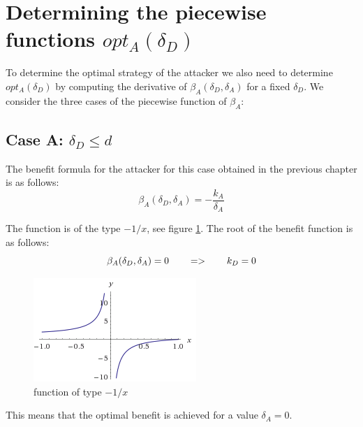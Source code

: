 \section{Determining the piecewise functions $opt_{A}(\delta_{D})$}
To determine the optimal strategy of the attacker we also need to determine $opt_{A}(\delta_{D})$ by computing the derivative of $\beta_{A}(\delta_{D},\delta_{A})$ for a fixed $\delta_{D}$. We consider the three cases of the piecewise function of $\beta_{A}$: \\


\subsection*{Case A: $\delta_{D} \leq d$}

The benefit formula for the attacker for this case obtained in the previous chapter is as follows:
\begin{equation}
\beta_{A}(\delta_{D},\delta_{A}) =  - \dfrac{k_{A}}{\delta_{A}}
\end{equation}


The function is of the type $-1/x$, see figure \ref{1xx}. The root of the benefit function is as follows:
\begin{equation}
\beta_{A}(\delta_{D},\delta_{A}) =0  ~~~~~~ =>~~~~~~k_{D} = 0 \\
\end{equation}


\begin{figure}[hbtp]
\centering
\includegraphics[scale=1]{Images/1x.png}
\caption{function of type $-1/x$}
\label{1xx}
\end{figure}

This means that the optimal benefit is achieved for a value $\delta_{A}=0$.





